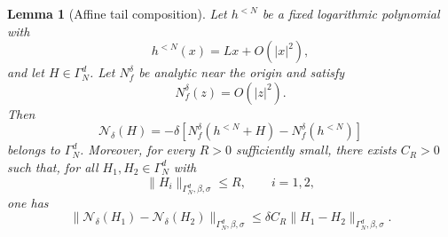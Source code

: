 \documentclass{amsart}
\theoremstyle{plain}
\newtheorem{lemma}[theorem]{Lemma}
\theoremstyle{definition}
\begin{document}

\begin{lemma}[Affine tail composition]\label{lemma_affine_tail}
Let $h^{<N}$ be a fixed logarithmic polynomial with
\begin{equation}
        h^{<N}(x)=Lx+O(|x|^2),
\end{equation}
and let $H\in\Gamma_N^d$. Let $N_f^\delta$ be analytic near the origin and satisfy
\begin{equation}
        N_f^\delta(z)=O(|z|^2).
\end{equation}
Then
\begin{equation}\label{N_delta}
        \mathcal N_\delta(H)
        =
        -\delta\left[
        N_f^\delta(h^{<N}+H)-N_f^\delta(h^{<N})
        \right]
\end{equation}
belongs to $\Gamma_N^d$. Moreover, for every $R>0$ sufficiently small, there exists
$C_R>0$ such that, for all $H_1,H_2\in\Gamma_N^d$ with
\begin{equation}
        \|H_i\|_{\Gamma_N^d,\beta,\sigma}\leq R,
        \qquad i=1,2,
\end{equation}
one has
\begin{equation}\label{bound_difference_N_delta}
        \|\mathcal N_\delta(H_1)-\mathcal N_\delta(H_2)\|_{\Gamma_N^d,\beta,\sigma}
        \le
        \delta C_R
        \|H_1-H_2\|_{\Gamma_N^d,\beta,\sigma}.
\end{equation}
\end{lemma}
\end{document}
